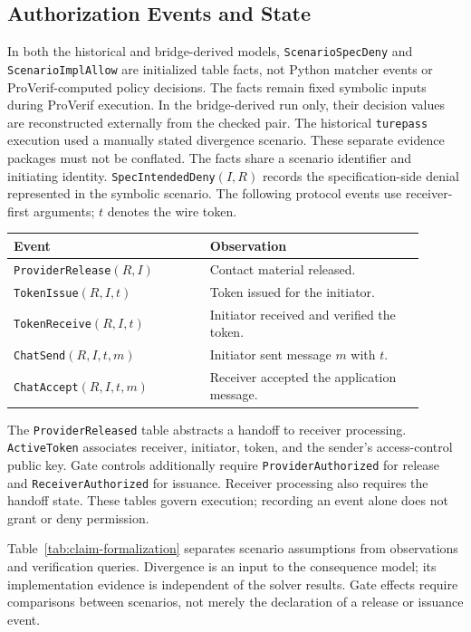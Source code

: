 \subsection{Authorization Events and State}

In both the historical and bridge-derived models, \texttt{ScenarioSpecDeny}
and \texttt{ScenarioImplAllow} are initialized table facts, not Python
matcher events or ProVerif-computed policy decisions. The facts remain fixed
symbolic inputs during ProVerif execution. In the bridge-derived run only,
their decision values are reconstructed externally from the checked pair.
The historical \texttt{turepass} execution used
a manually stated divergence scenario. These separate evidence packages
must not be conflated. The facts share a scenario identifier and initiating identity.
\texttt{SpecIntendedDeny}$(I,R)$ records the specification-side denial represented
in the symbolic scenario. The following
protocol events use receiver-first arguments; $t$ denotes the wire token.
\begin{center}
\begin{tabular}{p{0.43\linewidth}p{0.47\linewidth}}
\hline
Event & Observation \\
\hline
\texttt{ProviderRelease}$(R,I)$ & Contact material released. \\
\texttt{TokenIssue}$(R,I,t)$ & Token issued for the initiator. \\
\texttt{TokenReceive}$(R,I,t)$ & Initiator received and verified the token. \\
\texttt{ChatSend}$(R,I,t,m)$ & Initiator sent message $m$ with $t$. \\
\texttt{ChatAccept}$(R,I,t,m)$ & Receiver accepted the application message. \\
\hline
\end{tabular}
\end{center}

The \texttt{ProviderReleased} table abstracts a handoff to receiver processing.
\texttt{ActiveToken} associates receiver, initiator, token, and the sender's
access-control public key. Gate controls additionally require
\texttt{ProviderAuthorized} for release and \texttt{ReceiverAuthorized} for
issuance. Receiver processing also requires the handoff state. These tables
govern execution; recording an event alone does not grant or deny permission.


Table~\ref{tab:claim-formalization} separates scenario assumptions from
observations and verification queries. Divergence is an input to the
consequence model; its implementation evidence is independent of the solver
results. Gate effects require comparisons between scenarios, not merely
the declaration of a release or issuance event.

